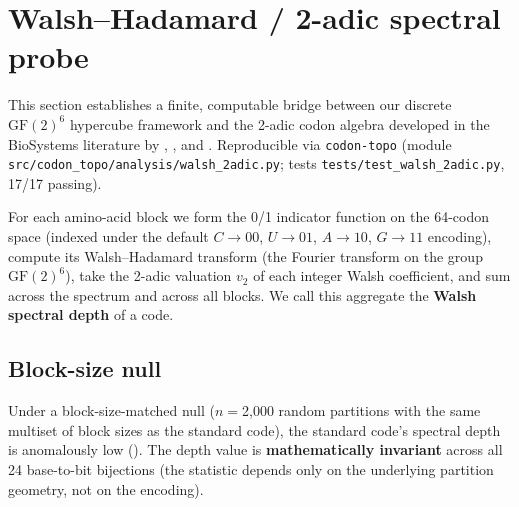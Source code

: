 \documentclass[preprint,11pt,authoryear,a4paper]{elsarticle}
\begin{document}
\section{Walsh--Hadamard / 2-adic spectral probe}\label{sec:s-walsh}

This section establishes a finite, computable bridge between our
discrete \({\text{GF}(2)}^{6}\) hypercube framework and the 2-adic codon
algebra developed in the BioSystems literature by
\citep{khrennikov2007}, \citep{dragovich2019}, and
\citep{axelsson2024a}. Reproducible via \texttt{codon-topo} (module
\texttt{src/codon\_topo/analysis/walsh\_2adic.py}; tests
\texttt{tests/test\_walsh\_2adic.py}, 17/17 passing).

For each amino-acid block we form the 0/1 indicator function on the
64-codon space (indexed under the default \(C \rightarrow 00\),
\(U \rightarrow 01\), \(A \rightarrow 10\), \(G \rightarrow 11\)
encoding), compute its Walsh--Hadamard transform (the Fourier transform
on the group \({\text{GF}(2)}^{6}\)), take the 2-adic valuation
\(v_{2}\) of each integer Walsh coefficient, and sum across the spectrum
and across all blocks. We call this aggregate the \textbf{Walsh spectral
depth} of a code.

\subsection{Block-size null}

Under a block-size-matched null (\(n =\)2,000 random partitions with the
same multiset of block sizes as the standard code), the standard code's
spectral depth is anomalously low (). The depth value
is \textbf{mathematically invariant} across all 24 base-to-bit
bijections (the statistic depends only on the underlying partition
geometry, not on the encoding).
\end{document}

